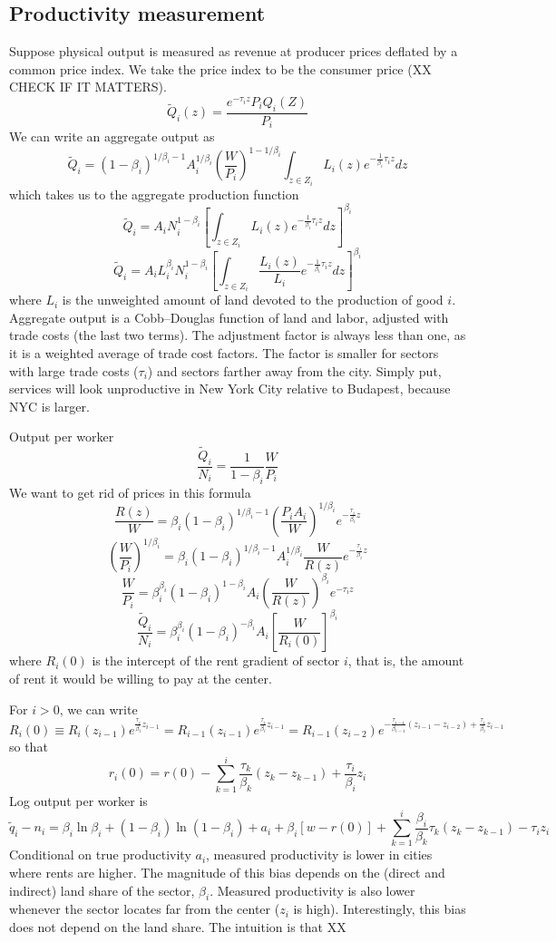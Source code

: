 \documentclass[12pt]{article}
\begin{document}
\subsection{Productivity measurement}
Suppose physical output is measured as revenue at producer prices deflated by a common price index. We take the price index to be the consumer price (XX CHECK IF IT MATTERS).
\[
\tilde Q_i(z) = \frac{e^{-\tau_i z}P_iQ_i(Z)}{P_i}
\]
We can write an aggregate output as
\[
\tilde Q_i = 
(1-\beta_i)^{1/\beta_i-1}
A_i^{1/\beta_i}\left(\frac{W}{P_i}\right)^{1-1/\beta_i}
\int_{z\in Z_i}L_i(z) e^{-\frac{1}{\beta_i}\tau_i z}dz
\]
which takes us to the aggregate production function
\[
\tilde Q_i = 
A_iN_i^{1-\beta_i}\left[\int_{z\in Z_i}L_i(z) e^{-\frac{1}{\beta_i}\tau_i z}dz\right]^{\beta_i}\]
\[
\tilde Q_i = 
A_iL_i^{\beta_i}N_i^{1-\beta_i}
\left[\int_{z\in Z_i}\frac{L_i(z)}{L_i} e^{-\frac{1}{\beta_i}\tau_i z}dz\right]^{\beta_i}
\]
where $L_i$ is the unweighted amount of land devoted to the production of good $i$. Aggregate output is a Cobb--Douglas function of land and labor, adjusted with trade costs (the last two terms). The adjustment factor is always less than one, as it is a weighted average of trade cost factors. The factor is smaller for sectors with large trade costs ($\tau_i$) and sectors farther away from the city. Simply put, services will look unproductive in New York City relative to Budapest, because NYC is larger.

Output per worker
\[
\frac{\tilde Q_i}{N_i} = \frac1{1-\beta_i}
\frac{W}{P_i} 
\]
We want to get rid of prices in this formula
\[
\frac{R(z)}{W} =\beta_i(1-\beta_i)^{1/\beta_i-1} \left(\frac{P_iA_i}{W}\right)^{1/\beta_i} e^{-\frac{\tau_i}{\beta_i} z}
\]
\[
\left(\frac{W}{P_i}\right)^{1/\beta_i}  =\beta_i(1-\beta_i)^{1/\beta_i-1} 
A_i^{1/\beta_i}
\frac{W}{R(z)}
 e^{-\frac{\tau_i}{\beta_i} z}
\]
\[
\frac{W}{P_i}  =\beta_i^{\beta_i}(1-\beta_i)^{1-\beta_i} 
A_i
\left(\frac{W}{R(z)}\right)^{\beta_i}
 e^{-\tau_i  z}
\]
\[
\frac{\tilde Q_i}{N_i} = \beta_i^{\beta_i}(1-\beta_i)^{-\beta_i} 
A_i
\left[\frac{W}{R_i(0)}\right]^{\beta_i}
 \]
where $R_i(0)$ is the intercept of the rent gradient of sector $i$, that is, the amount of rent it would be willing to pay at the center. 

For $i>0$, we can write 
\[
R_i(0) \equiv R_i(z_{i-1})e^{\frac{\tau_i}{\beta_i}z_{i-1}} = R_{i-1}(z_{i-1})e^{\frac{\tau_i}{\beta_i}z_{i-1}}
= R_{i-1}(z_{i-2})
e^{-\frac{\tau_{i-1}}{\beta_{i-1}}(z_{i-1}-z_{i-2})+\frac{\tau_i}{\beta_i}z_{i-1}}
\]
so that
\[
r_i(0) = r(0)-\sum_{k=1}^i 
\frac{\tau_{k}}{\beta_{k}}(z_{k}-z_{k-1})
+ \frac{\tau_{i}}{\beta_{i}}z_{i}
\]
Log output per worker is
\[
\tilde q_i - n_i = 
\beta_i\ln\beta_i+(1-\beta_i)\ln(1-\beta_i)
+a_i +\beta_i [w
-r(0)]
+\sum_{k=1}^i 
\frac{\beta_i}{\beta_{k}}\tau_{k}(z_{k}-z_{k-1})
- \tau_{i}z_{i}
\]
Conditional on true productivity $a_i$, measured productivity is lower in cities where rents are higher. The magnitude of this bias depends on the (direct and indirect) land share of the sector, $\beta_i$. Measured productivity is also lower whenever the sector locates far from the center ($z_i$ is high). Interestingly, this bias does not depend on the land share. The intuition is that XX
\end{document}
